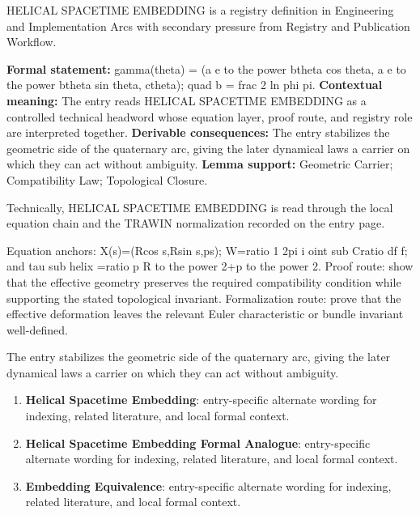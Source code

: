 
\begingroup\small
{}
HELICAL SPACETIME EMBEDDING is a registry definition in Engineering and Implementation Arcs with secondary pressure from Registry and Publication Workflow.

\begingroup\footnotesize\setlength{\emergencystretch}{3em}\sloppy
\textbf{Formal statement:} gamma(theta) = (a e to the power btheta cos theta, a e to the power btheta sin theta, ctheta); quad b = frac 2 ln phi pi. \textbf{Contextual meaning:} The entry reads HELICAL SPACETIME EMBEDDING as a controlled technical headword whose equation layer, proof route, and registry role are interpreted together. \textbf{Derivable consequences:} The entry stabilizes the geometric side of the quaternary arc, giving the later dynamical laws a carrier on which they can act without ambiguity. \textbf{Lemma support:} Geometric Carrier; Compatibility Law; Topological Closure.\par
\endgroup

Technically, HELICAL SPACETIME EMBEDDING is read through the local equation chain and the TRAWIN normalization recorded on the entry page.

Equation anchors: X(s)=(Rcos s,Rsin s,ps); W=ratio 1 2pi i oint sub Cratio df f; and tau sub helix =ratio p R to the power 2+p to the power 2. Proof route: show that the effective geometry preserves the required compatibility condition while supporting the stated topological invariant. Formalization route: prove that the effective deformation leaves the relevant Euler characteristic or bundle invariant well-defined.

The entry stabilizes the geometric side of the quaternary arc, giving the later dynamical laws a carrier on which they can act without ambiguity.
\endgroup

\begin{enumerate}[leftmargin=1.6em,itemsep=6pt,topsep=4pt]
\item \textbf{Helical Spacetime Embedding}: entry-specific alternate wording for indexing, related literature, and local formal context.
\item \textbf{Helical Spacetime Embedding Formal Analogue}: entry-specific alternate wording for indexing, related literature, and local formal context.
\item \textbf{Embedding Equivalence}: entry-specific alternate wording for indexing, related literature, and local formal context.
\end{enumerate}

